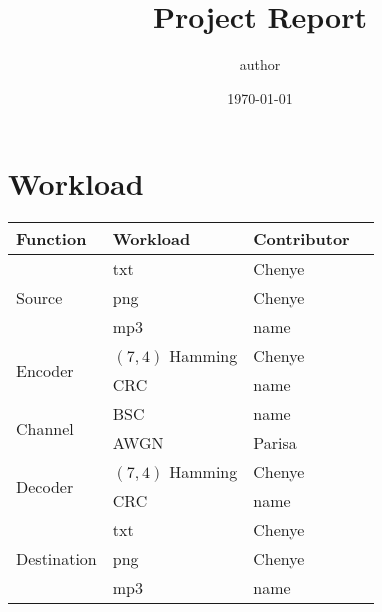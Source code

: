 \documentclass{article}
\title{Project Report}
\author{author}
\date{\today}
\begin{document}
\maketitle

\section{Workload}


\begin{center}
    \begin{tabularx}{\textwidth}{ |X|X|X|X| } 
    \hline
    Function & Workload & Contributor \\
    \hline
    \multirow{3}{4em}{Source} & txt & Chenye \\ 
    & png & Chenye \\ 
    & mp3 & name \\ 
    \hline
    \multirow{2}{4em}{Encoder} & $(7,4)$ Hamming & Chenye \\ 
    & CRC & name \\ 
    \hline
    \multirow{2}{4em}{Channel} & BSC & name \\ 
    & AWGN & Parisa \\ 
    \hline
    \multirow{2}{4em}{Decoder} & $(7,4)$ Hamming & Chenye \\ 
    & CRC & name \\ 
    \hline
    \multirow{3}{4em}{Destination} & txt & Chenye \\ 
    & png & Chenye \\ 
    & mp3 & name \\ 
    \hline
    \end{tabularx}
\end{center}
\end{document}
